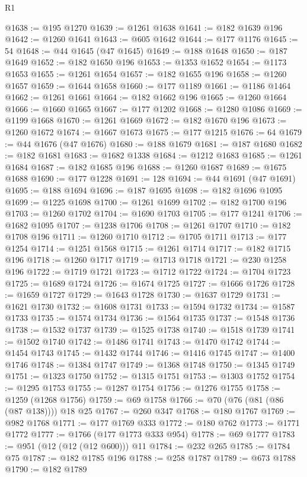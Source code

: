\begin{lexlean}{R1}
\begin{coremodule}
@1638 := @195 @1270
@1639 := @1261 @1638
@1641 := @182 @1639 @196
@1642 := @1260 @1641
@1643 := @605 @1642
@1644 := @177 @1176
@1645 := 54
@1648 := @44 @1645 (@47 @1645)
@1649 := @188 @1648
@1650 := @187 @1649
@1652 := @182 @1650 @196
@1653 := @1353 @1652
@1654 := @1173 @1653
@1655 := @1261 @1654
@1657 := @182 @1655 @196
@1658 := @1260 @1657
@1659 := @1644 @1658
@1660 := @177 @1189
@1661 := @1186 @1464
@1662 := @1261 @1661
@1664 := @182 @1662 @196
@1665 := @1260 @1664
@1666 := @1660 @1665
@1667 := @177 @1202
@1668 := @1280 @1086
@1669 := @1199 @1668
@1670 := @1261 @1669
@1672 := @182 @1670 @196
@1673 := @1260 @1672
@1674 := @1667 @1673
@1675 := @177 @1215
@1676 := 64
@1679 := @44 @1676 (@47 @1676)
@1680 := @188 @1679
@1681 := @187 @1680
@1682 := @182 @1681
@1683 := @1682 @1338
@1684 := @1212 @1683
@1685 := @1261 @1684
@1687 := @182 @1685 @196
@1688 := @1260 @1687
@1689 := @1675 @1688
@1690 := @177 @1228
@1691 := 128
@1694 := @44 @1691 (@47 @1691)
@1695 := @188 @1694
@1696 := @187 @1695
@1698 := @182 @1696 @1095
@1699 := @1225 @1698
@1700 := @1261 @1699
@1702 := @182 @1700 @196
@1703 := @1260 @1702
@1704 := @1690 @1703
@1705 := @177 @1241
@1706 := @1682 @1095
@1707 := @1238 @1706
@1708 := @1261 @1707
@1710 := @182 @1708 @196
@1711 := @1260 @1710
@1712 := @1705 @1711
@1713 := @177 @1254
@1714 := @1251 @1568
@1715 := @1261 @1714
@1717 := @182 @1715 @196
@1718 := @1260 @1717
@1719 := @1713 @1718
@1721 := @230 @1258 @196
@1722 := @1719 @1721
@1723 := @1712 @1722
@1724 := @1704 @1723
@1725 := @1689 @1724
@1726 := @1674 @1725
@1727 := @1666 @1726
@1728 := @1659 @1727
@1729 := @1643 @1728
@1730 := @1637 @1729
@1731 := @1621 @1730
@1732 := @1608 @1731
@1733 := @1594 @1732
@1734 := @1587 @1733
@1735 := @1574 @1734
@1736 := @1564 @1735
@1737 := @1548 @1736
@1738 := @1532 @1737
@1739 := @1525 @1738
@1740 := @1518 @1739
@1741 := @1502 @1740
@1742 := @1486 @1741
@1743 := @1470 @1742
@1744 := @1454 @1743
@1745 := @1432 @1744
@1746 := @1416 @1745
@1747 := @1400 @1746
@1748 := @1384 @1747
@1749 := @1368 @1748
@1750 := @1345 @1749
@1751 := @1323 @1750
@1752 := @1315 @1751
@1753 := @1303 @1752
@1754 := @1295 @1753
@1755 := @1287 @1754
@1756 := @1276 @1755
@1758 := @1259 (@1268 @1756)
@1759 := @69 @1758
@1766 := @70 (@76 (@81 (@86 (@87 @138)))) @18 @25
@1767 := @260 @347
@1768 := @180 @1767
@1769 := @982 @1768
@1771 := @177 @1769 @333
@1772 := @180 @762
@1773 := @1771 @1772
@1777 := @1766 (@177 @1773 @333 @954)
@1778 := @69 @1777
@1783 := @951 (@12 (@12 (@12 @600))) @11
@1784 := @232 @265
@1785 := @1784 @75
@1787 := @182 @1785 @196
@1788 := @258 @1787
@1789 := @673 @1788
@1790 := @182 @1789

\end{coremodule}
\end{lexlean}
